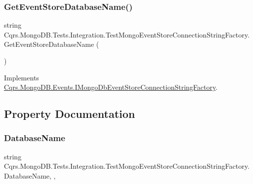 \subsubsection{\texorpdfstring{Get\+Event\+Store\+Database\+Name()}{GetEventStoreDatabaseName()}}
{\footnotesize\ttfamily string Cqrs.\+Mongo\+D\+B.\+Tests.\+Integration.\+Test\+Mongo\+Event\+Store\+Connection\+String\+Factory.\+Get\+Event\+Store\+Database\+Name (\begin{DoxyParamCaption}{ }\end{DoxyParamCaption})}



Implements \hyperlink{interfaceCqrs_1_1MongoDB_1_1Events_1_1IMongoDbEventStoreConnectionStringFactory_a81ee28bfbb0e567b95f2b280bc6fb298}{Cqrs.\+Mongo\+D\+B.\+Events.\+I\+Mongo\+Db\+Event\+Store\+Connection\+String\+Factory}.



\subsection{Property Documentation}
\mbox{\label{classCqrs_1_1MongoDB_1_1Tests_1_1Integration_1_1TestMongoEventStoreConnectionStringFactory_a647bfdbf4eef2cffe60f86e3ac01efac}} 
\subsubsection{\texorpdfstring{Database\+Name}{DatabaseName}}
{\footnotesize\ttfamily string Cqrs.\+Mongo\+D\+B.\+Tests.\+Integration.\+Test\+Mongo\+Event\+Store\+Connection\+String\+Factory.\+Database\+Name\hspace{0.3cm}{\ttfamily [static]}, {\ttfamily [get]}, {\ttfamily [set]}}

